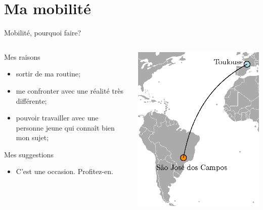 \documentclass{beamer}
\begin{document}
\section{Ma mobilité}
\begin{frame}{Mobilité, pourquoi faire?}
\begin{columns}
	\begin{column}{0.5\textwidth}
		Mes raisons
		\begin{itemize}		
		\item sortir de ma routine;
		\item me confronter avec une réalité très différente;
		\item pouvoir travailler avec une personne jeune qui connaît bien mon sujet;
		\end{itemize}
		Mes suggestions
		\begin{itemize}
			\item{C'est une occasion. Profitez-en.}
		\end{itemize}
	\end{column}
	\begin{column}{0.5\textwidth}
		\centering
		\includegraphics[scale=0.9]{trip_sjc.eps}
	\end{column}
\end{columns}
\end{frame}
\end{document}
